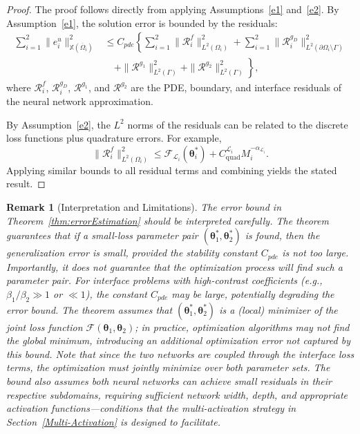 \documentclass{article}
\newtheorem{remark}{Remark}[section]
\newtheorem{proof}{Proof}[section]
\begin{document}
\begin{proof}
The proof follows directly from applying Assumptions~\ref{e1} and~\ref{e2}. By Assumption~\ref{e1}, the solution error is bounded by the residuals:
\begin{equation}
\begin{aligned}
\sum_{i=1}^{2} \|e_i^u\|^2_{\mathbb{X}(\overline{\Omega}_i)} &\leq C_{pde} \left\{ \sum_{i=1}^{2} \|\mathcal{R}_i^f\|^2_{L^2(\Omega_i)} + \sum_{i=1}^{2} \|\mathcal{R}_i^{g_D}\|^2_{L^2(\partial\Omega_i \setminus \Gamma)} \right.\\
&\quad \left. + \|\mathcal{R}^{g_1}\|^2_{L^2(\Gamma)} + \|\mathcal{R}^{g_2}\|^2_{L^2(\Gamma)} \right\},
\end{aligned}
\end{equation}
where $\mathcal{R}_i^f$, $\mathcal{R}_i^{g_D}$, $\mathcal{R}^{g_1}$, and $\mathcal{R}^{g_2}$ are the PDE, boundary, and interface residuals of the neural network approximation.

By Assumption~\ref{e2}, the $L^2$ norms of the residuals can be related to the discrete loss functions plus quadrature errors. For example,
\[
\|\mathcal{R}_i^f\|^2_{L^2(\Omega_i)} \leq \mathcal{F}_{\mathcal{L}_i}(\boldsymbol{\theta}_i^*) + C_{\text{quad}}^{\mathcal{L}_i}M_{i}^{-\alpha_{\mathcal{L}_i}}.
\]
Applying similar bounds to all residual terms and combining yields the stated result.
\end{proof}

\begin{remark}[Interpretation and Limitations]
The error bound in Theorem~\ref{thm:errorEstimation} should be interpreted carefully. The theorem guarantees that \emph{if} a small-loss parameter pair $(\boldsymbol{\theta}_1^*, \boldsymbol{\theta}_2^*)$ is found, \emph{then} the generalization error is small, provided the stability constant $C_{pde}$ is not too large. Importantly, \emph{it does not guarantee that the optimization process will find such a parameter pair}. For interface problems with high-contrast coefficients (e.g., $\beta_1/\beta_2 \gg 1$ or $\ll 1$), the constant $C_{pde}$ may be large, potentially degrading the error bound. The theorem assumes that $(\boldsymbol{\theta}_1^*, \boldsymbol{\theta}_2^*)$ is a (local) minimizer of the joint loss function $\mathcal{F}(\boldsymbol{\theta}_1, \boldsymbol{\theta}_2)$; in practice, optimization algorithms may not find the global minimum, introducing an additional optimization error not captured by this bound. Note that since the two networks are coupled through the interface loss terms, the optimization must jointly minimize over both parameter sets. The bound also assumes both neural networks can achieve small residuals in their respective subdomains, requiring sufficient network width, depth, and appropriate activation functions---conditions that the multi-activation strategy in Section~\ref{Multi-Activation} is designed to facilitate.
\end{remark}
\end{document}
